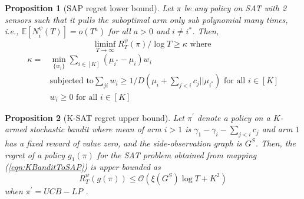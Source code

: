 \documentclass{article}
\newtheorem{proposition}{Proposition}
\begin{document}
\begin{proposition}[SAP regret lower bound]
	Let $\pi$ be any policy on SAT with 2 sensors such that it pulls the suboptimal arm only sub polynomial many times, i.e., $\mathbb{E}[N^\psi_i(T)]=o(T^a)$ for all $a>0$ and $i\neq i^*$. Then,
	\begin{equation}
	\liminf_{T \rightarrow \infty} R^\psi_T(\pi)/\log T \geq \kappa \mbox{	where  }
	\end{equation}
		\begin{align}
	\kappa=&\displaystyle\min_{\{w_i\}}\sum_{i \in [K]}(\mu_{i^*}- \mu_i) w_i \nonumber\\
	& \mbox{subjected to} \sum_{j i}w_i\geq 1/D(\mu_i + \sum_{j<i} c_j || \mu_{i^*}) \mbox{  for all } i\in [K]\\
	& w_i \geq 0 \mbox{ for all } i \in [K] \nonumber
	\end{align}
\end{proposition}

\begin{proposition}[K-SAT regret upper bound]
	Let $\pi^\prime$ denote a policy on a $K$-armed stochastic bandit where mean of arm $i>1$ is $\gamma_1-\gamma_i-\sum_{j<i}c_j$ and arm $1$ has a fixed reward of value zero, and the side-observation graph is $G^S$.  Then, the regret of a policy $g_1(\pi)$ for the SAT problem obtained from mapping (\ref{eqn:KBanditToSAP}) is upper bounded as
	\begin{equation}
	R^\psi_T(g(\pi))\leq \mathcal{O}(\xi(G^S)\log T + K^2)
	\end{equation}
	when $\pi^\prime=UCB-LP$ \cite{Sigmetrics15_StochasticBanditsWithSideObservations_BuccapatnamEriyilmazShroff}.
\end{proposition}
\end{document}
